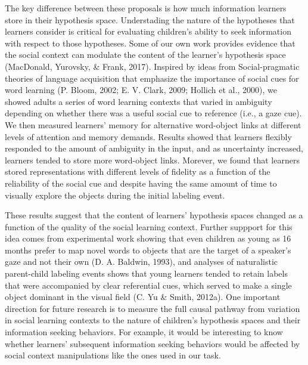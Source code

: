 \documentclass[english,floatsintext,man]{apa6}
\theoremstyle{definition}
\theoremstyle{definition}
\theoremstyle{definition}
\theoremstyle{remark}
\begin{document}
The key difference between these proposals is how much information
learners store in their hypothesis space. Understading the nature of the
hypotheses that learners consider is critical for evaluating children's
ability to seek information with respect to those hypotheses. Some of
our own work provides evidence that the social context can modulate the
content of the learner's hypothesis space (MacDonald, Yurovsky, \&
Frank, 2017). Inspired by ideas from Social-pragmatic theories of
language acquisition that emphasize the importance of social cues for
word learning (P. Bloom, 2002; E. V. Clark, 2009; Hollich et al., 2000),
we showed adults a series of word learning contexts that varied in
ambiguity depending on whether there was a useful social cue to
reference (i.e., a gaze cue). We then measured learners' memory for
alternative word-object links at different levels of attention and
memory demands. Results showed that learners flexibly responded to the
amount of ambiguity in the input, and as uncertainty increased, learners
tended to store more word-object links. Morever, we found that learners
stored representations with different levels of fidelity as a function
of the reliability of the social cue and despite having the same amount
of time to visually explore the objects during the initial labeling
event.

These results suggest that the content of learners' hypothesis spaces
changed as a function of the quality of the social learning context.
Further suppport for this idea comes from experimental work showing that
even children as young as 16 months prefer to map novel words to objects
that are the target of a speaker's gaze and not their own (D. A.
Baldwin, 1993), and analyses of naturalistic parent-child labeling
events shows that young learners tended to retain labels that were
accompanied by clear referential cues, which served to make a single
object dominant in the visual field (C. Yu \& Smith, 2012a). One
important direction for future research is to measure the full causal
pathway from variation in social learning contexts to the nature of
children's hypothesis spaces and their information seeking behaviors.
For example, it would be interesting to know whether learners'
subsequent information seeking behaviors would be affected by social
context manipulations like the ones used in our task.
\end{document}
